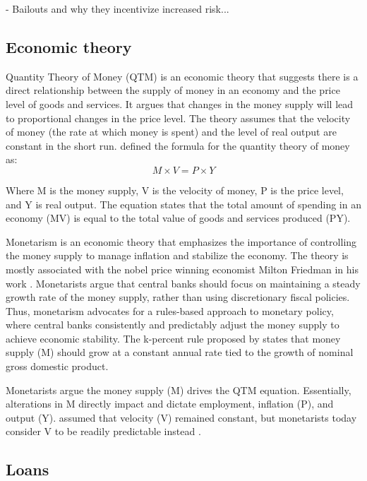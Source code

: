 - Bailouts and why they incentivize increased risk...

\subsection{Economic theory}
Quantity Theory of Money (QTM) is an economic theory that suggests there is a direct relationship between the supply of money in an economy and the price level of goods and services. It argues that changes in the money supply will lead to proportional changes in the price level. The theory assumes that the velocity of money (the rate at which money is spent) and the level of real output are constant in the short run. \textcite{fisherQTM} defined the formula for the quantity theory of money as:
\begin{equation}
    M \times V = P \times Y
\end{equation}

Where M is the money supply, V is the velocity of money, P is the price level, and Y is real output. The equation states that the total amount of spending in an economy (MV) is equal to the total value of goods and services produced (PY).

Monetarism is an economic theory that emphasizes the importance of controlling the money supply to manage inflation and stabilize the economy. The theory is mostly associated with the nobel price winning economist Milton Friedman in his work \textcite{friedman2008monetary}. Monetarists argue that central banks should focus on maintaining a steady growth rate of the money supply, rather than using discretionary fiscal policies. Thus, monetarism advocates for a rules-based approach to monetary policy, where central banks consistently and predictably adjust the money supply to achieve economic stability. The k-percent rule proposed by \textcite{friedman2008monetary} states that money supply (M) should grow at a constant annual rate tied to the growth of nominal gross domestic product. 

Monetarists argue the money supply (M) drives the QTM equation. Essentially, alterations in M directly impact and dictate employment, inflation (P), and output (Y). \textcite{friedman2008monetary} assumed that velocity (V) remained constant, but monetarists today consider V to be readily predictable instead \cite{monetarismInvestopedia}. 


\subsection{Loans}

